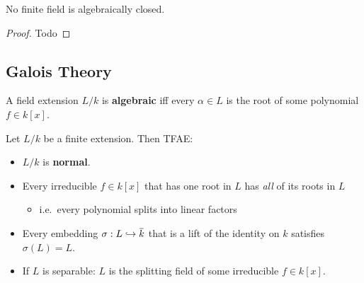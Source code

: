 \begin{proposition}

No finite field is algebraically closed.

\end{proposition}

\begin{proof}

Todo

\end{proof}


\hypertarget{galois-theory}{%
\subsection{Galois Theory}\label{galois-theory}}

\begin{definition}

A field extension \(L/k\) is \textbf{algebraic} iff every
\(\alpha \in L\) is the root of some polynomial \(f\in k[x]\).

\end{definition}

\begin{definition}

Let \(L/k\) be a finite extension. Then TFAE:

\begin{itemize}
\item
  \(L/k\) is \textbf{normal}.
\item
  Every irreducible \(f\in k[x]\) that has one root in \(L\) has
  \emph{all} of its roots in \(L\)

  \begin{itemize}
  \tightlist
  \item
    i.e.~every polynomial splits into linear factors
  \end{itemize}
\item
  Every embedding
  \(\sigma: L \hookrightarrow\mkern 1.5mu\overline{\mkern-1.5muk\mkern-1.5mu}\mkern 1.5mu\)
  that is a lift of the identity on \(k\) satisfies \(\sigma(L) = L\).
\item
  If \(L\) is separable: \(L\) is the splitting field of some
  irreducible \(f\in k[x]\).
\end{itemize}

\end{definition}

